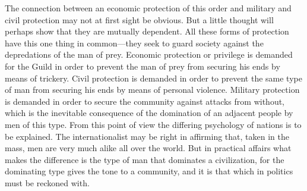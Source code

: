\documentclass{book}
\begin{document}
The connection between an economic protection of this order and military and civil protection may not at first sight be obvious. But a little thought will perhaps show that they are mutually dependent. All these forms of protection have this one thing in common—they seek to guard society against the depredations of the man of prey. Economic protection or privilege is demanded for the Guild in order to prevent the man of prey from securing his ends by means of trickery. Civil protection is demanded in order to prevent the same type of man from securing his ends by means of personal violence. Military protection is demanded in order to secure the community against attacks from without, which is the inevitable consequence of the domination of an adjacent people by men of this type. From this point of view the differing psychology of nations is to be explained. The internationalist may be right in affirming that, taken in the mass, men are very much alike all over the world. But in practical affairs what makes the difference is the type of man that dominates a civilization, for the dominating type gives the tone to a community, and it is that which in politics must be reckoned with.
\end{document}
